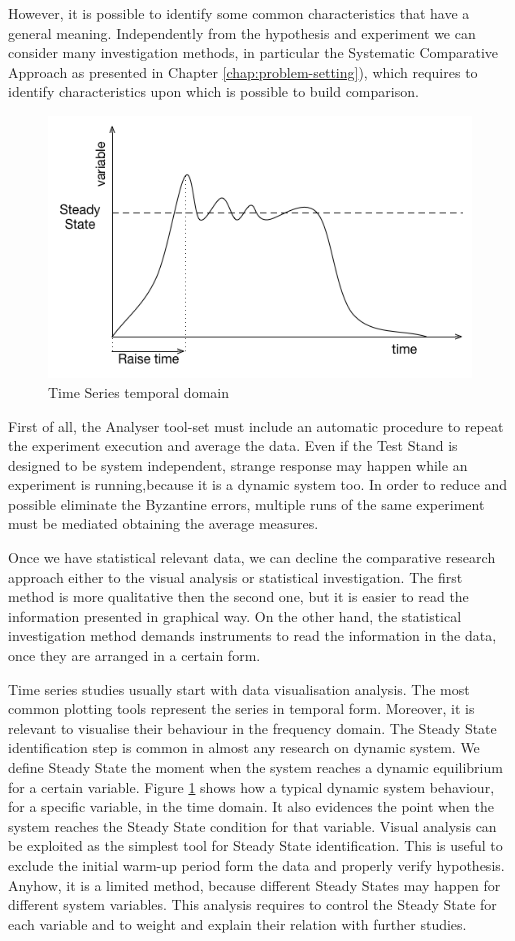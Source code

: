 However, it is possible to identify some common characteristics that have a general meaning. Independently from the hypothesis and  experiment we can consider many investigation methods, in particular the Systematic Comparative Approach as presented in Chapter \ref{chap:problem-setting}), which requires to identify characteristics upon which is possible to build comparison. 

\begin{figure}[tbh]
  \centering
	\includegraphics[width=0.5\linewidth]{images/steady-state}
	\caption{Time Series temporal domain} 	
  	\label{fig:steady-state}
\end{figure}

First of all, the Analyser tool-set must include an automatic procedure to repeat the experiment execution and average the data. Even if the Test Stand is designed to be system independent, strange response may happen while an experiment is running,because it is a dynamic system too. In order to reduce and possible eliminate the Byzantine errors, multiple runs of the same experiment must be mediated obtaining the average measures. 

Once we have statistical relevant data, we can decline the comparative research approach either to the visual analysis or statistical investigation. The first method is more qualitative then the second one, but it is easier to read the information presented in graphical way. On the other hand, the statistical investigation method demands instruments to read the information in the data, once they are arranged in a certain form.

Time series studies usually start with data visualisation analysis. The most common  plotting tools represent the series in temporal form. Moreover, it is relevant to visualise their behaviour in the frequency domain. The Steady State identification step is common in almost any research on dynamic system. We define Steady State the moment when the system reaches a dynamic equilibrium for a certain variable. Figure \ref{fig:steady-state} shows how a typical dynamic system behaviour, for a specific variable, in the time domain. It also evidences the point when the system reaches the Steady State condition for that variable. Visual analysis can be exploited as the simplest tool for Steady State identification. This is useful to exclude the initial warm-up period form the data and properly verify hypothesis. Anyhow, it is a limited method, because different Steady States may happen for different system variables. This analysis requires to control the Steady State for each variable and to weight and explain their relation with further studies.

